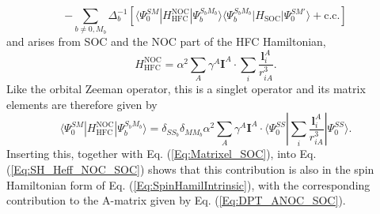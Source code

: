 \begin{equation}
\label{Eq:SH_Heff_NOC_SOC}
- \sum_{b\neq 0, M_b} \Delta_b^{-1}[\langle \Psi_0^{SM}|H_\text{HFC}^\text{NOC}|\Psi_b^{S_b M_b}\rangle \langle \Psi_b^{S_b M_b}| H_\text{SOC} | \Psi_0^{SM'}\rangle + \text{c.c.}]
\end{equation}
and arises from SOC and the NOC part of the HFC Hamiltonian,
\begin{equation}
H_\text{HFC}^\text{NOC} = \alpha^2 \sum_A \gamma^A \mathbf{I}^A \cdot \sum_i \frac{\mathbf{l}_i^A}{r_{iA}^3}.
\end{equation}
Like the orbital Zeeman operator, this is a singlet operator and its matrix elements are therefore given by
\begin{equation}
\label{Eq:Matrixel_NOC}
\langle \Psi_0^{SM}|H_\text{HFC}^\text{NOC}|\Psi_b^{S_b M_b}\rangle = \delta_{SS_b} \delta_{MM_b} \alpha^2 \sum_A \gamma^A \mathbf{I}^A \cdot \langle \Psi_0^{SS}|\sum_i \frac{\mathbf{l}_i^A}{r_{iA}^3}|\Psi_0^{SS}\rangle.
\end{equation}
Inserting this, together with Eq. (\ref{Eq:Matrixel_SOC}), into Eq. (\ref{Eq:SH_Heff_NOC_SOC}) shows that this contribution is also in the spin Hamiltonian form of Eq. (\ref{Eq:SpinHamilIntrinsic}), with the corresponding contribution to the A-matrix given by Eq. (\ref{Eq:DPT_ANOC_SOC}).

